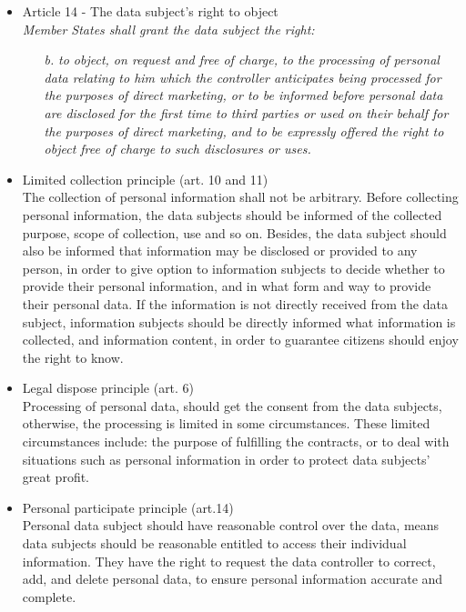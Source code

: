 \documentclass[11pt]{article}
\begin{document}
\begin{itemize}
\begin{itemize}
		\end{itemize}

	\item Article 14 - The data subject's right to object\\
		\emph{Member States shall grant the data subject the right:}
		\begin{itemize}
			\item  [\textit{b.}] {\it to object, on request and free of charge, to the processing of personal data relating to him which the controller anticipates being processed for the purposes of direct marketing, or to be informed before personal data are disclosed for the first time to third parties or used on their behalf for the purposes of direct marketing, and to be expressly offered the right to object free of charge to such disclosures or uses.}
		\end{itemize}

	\item Limited collection principle (art. 10 and 11)\\
The collection of personal information shall not be arbitrary. Before collecting personal information, the data subjects should be informed of the collected purpose, scope of collection, use and so on. Besides, the data subject should also be informed that information may be disclosed or provided to any person, in order to give option to information subjects to decide whether to provide their personal information, and in what form and way to provide their personal data. If the information is not directly received from the data subject, information subjects should be directly informed what information is collected, and information content, in order to guarantee citizens should enjoy the right to know.

	\item Legal dispose principle (art. 6)\\
Processing of personal data, should get the consent from the data subjects, otherwise, the processing is limited in some circumstances. These limited circumstances include: the purpose of fulfilling the contracts, or to deal with situations such as personal information in order to protect data subjects’ great profit.

	\item Personal participate principle (art.14)\\
Personal data subject should have reasonable control over the data, means data subjects should be reasonable entitled to access their individual information. They have the right to request the data controller to correct, add, and delete personal data, to ensure personal information accurate and complete.


\end{itemize}
\end{document}
